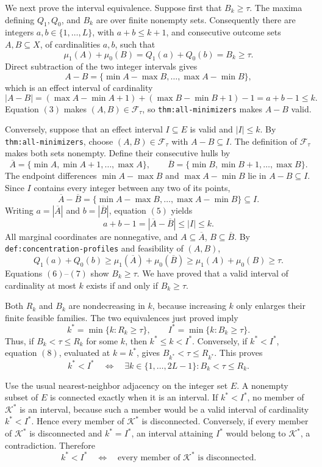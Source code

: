 We next prove the interval equivalence.  Suppose first that \(B_k\geq\tau\).  The maxima defining \(Q_1,Q_0\), and \(B_k\) are over finite nonempty sets.  Consequently there are integers \(a,b\in\{1,\ldots,L\}\), with \(a+b\leq k+1\), and consecutive outcome sets \(A,B\subseteq X\), of cardinalities \(a,b\), such that
\[
\mu_1(A)+\mu_0(B)=Q_1(a)+Q_0(b)=B_k\geq\tau.
\tag{3}
\]
Direct subtraction of the two integer intervals gives
\[
A-B=\{\min A-\max B,\ldots,\max A-\min B\},
\]
which is an effect interval of cardinality
\[
|A-B|=(\max A-\min A+1)+(\max B-\min B+1)-1=a+b-1\leq k.
\tag{4}
\]
Equation \((3)\) makes \((A,B)\in\mathcal F_{\tau}\), so \texttt{thm:all-minimizers} makes \(A-B\) valid.

Conversely, suppose that an effect interval \(I\subseteq E\) is valid and \(|I|\leq k\).  By \texttt{thm:all-minimizers}, choose \((A,B)\in\mathcal F_{\tau}\) with \(A-B\subseteq I\).  The definition of \(\mathcal F_{\tau}\) makes both sets nonempty.  Define their consecutive hulls by
\[
\overline A=\{\min A,\min A+1,\ldots,\max A\},
\qquad
\overline B=\{\min B,\min B+1,\ldots,\max B\}.
\]
The endpoint differences \(\min A-\max B\) and \(\max A-\min B\) lie in \(A-B\subseteq I\).  Since \(I\) contains every integer between any two of its points,
\[
\overline A-\overline B
=\{\min A-\max B,\ldots,\max A-\min B\}
\subseteq I.
\tag{5}
\]
Writing \(a=|\overline A|\) and \(b=|\overline B|\), equation \((5)\) yields
\[
a+b-1=|\overline A-\overline B|\leq |I|\leq k.
\tag{6}
\]
All marginal coordinates are nonnegative, and \(A\subseteq\overline A\), \(B\subseteq\overline B\).  By \texttt{def:concentration-profiles} and feasibility of \((A,B)\),
\[
Q_1(a)+Q_0(b)
\geq\mu_1(\overline A)+\mu_0(\overline B)
\geq\mu_1(A)+\mu_0(B)
\geq\tau.
\tag{7}
\]
Equations \((6)\)--\((7)\) show \(B_k\geq\tau\).  We have proved that a valid interval of cardinality at most \(k\) exists if and only if \(B_k\geq\tau\).

Both \(R_k\) and \(B_k\) are nondecreasing in \(k\), because increasing \(k\) only enlarges their finite feasible families.  The two equivalences just proved imply
\[
k^*=\min\{k:R_k\geq\tau\},
\qquad
I^*=\min\{k:B_k\geq\tau\}.
\tag{8}
\]
Thus, if \(B_k<\tau\leq R_k\) for some \(k\), then \(k^*\leq k<I^*\).  Conversely, if \(k^*<I^*\), equation \((8)\), evaluated at \(k=k^*\), gives \(B_{k^*}<\tau\leq R_{k^*}\).  This proves
\[
k^*<I^*
\quad\Longleftrightarrow\quad
\exists k\in\{1,\ldots,2L-1\}:B_k<\tau\leq R_k.
\tag{9}
\]

Use the usual nearest-neighbor adjacency on the integer set \(E\).  A nonempty subset of \(E\) is connected exactly when it is an interval.  If \(k^*<I^*\), no member of \(\mathcal K^*\) is an interval, because such a member would be a valid interval of cardinality \(k^*<I^*\).  Hence every member of \(\mathcal K^*\) is disconnected.  Conversely, if every member of \(\mathcal K^*\) is disconnected and \(k^*=I^*\), an interval attaining \(I^*\) would belong to \(\mathcal K^*\), a contradiction.  Therefore
\[
k^*<I^*
\quad\Longleftrightarrow\quad
\text{every member of }\mathcal K^*\text{ is disconnected}.
\tag{10}
\]

